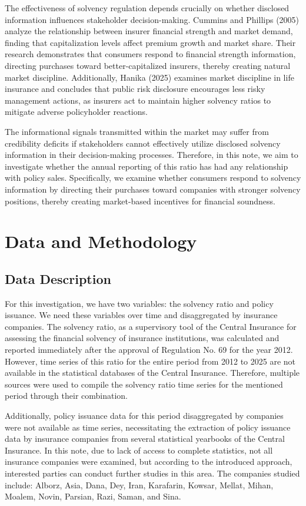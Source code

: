 \documentclass[twoside]{article}
\begin{document}
The effectiveness of solvency regulation depends crucially on whether disclosed information influences stakeholder decision-making. Cummins and Phillips (2005) analyze the relationship between insurer financial strength and market demand, finding that capitalization levels affect premium growth and market share. Their research demonstrates that consumers respond to financial strength information, directing purchases toward better-capitalized insurers, thereby creating natural market discipline. Additionally, Hanika (2025) examines market discipline in life insurance and concludes that public risk disclosure encourages less risky management actions, as insurers act to maintain higher solvency ratios to mitigate adverse policyholder reactions.

The informational signals transmitted within the market may suffer from credibility deficits if stakeholders cannot effectively utilize disclosed solvency information in their decision-making processes. Therefore, in this note, we aim to investigate whether the annual reporting of this ratio has had any relationship with policy sales. Specifically, we examine whether consumers respond to solvency information by directing their purchases toward companies with stronger solvency positions, thereby creating market-based incentives for financial soundness.

\section{Data and Methodology}

\subsection{Data Description}

For this investigation, we have two variables: the solvency ratio and policy issuance. We need these variables over time and disaggregated by insurance companies. The solvency ratio, as a supervisory tool of the Central Insurance for assessing the financial solvency of insurance institutions, was calculated and reported immediately after the approval of Regulation No. 69 for the year 2012. However, time series of this ratio for the entire period from 2012 to 2025 are not available in the statistical databases of the Central Insurance. Therefore, multiple sources were used to compile the solvency ratio time series for the mentioned period through their combination.

Additionally, policy issuance data for this period disaggregated by companies were not available as time series, necessitating the extraction of policy issuance data by insurance companies from several statistical yearbooks of the Central Insurance. In this note, due to lack of access to complete statistics, not all insurance companies were examined, but according to the introduced approach, interested parties can conduct further studies in this area. The companies studied include: Alborz, Asia, Dana, Dey, Iran, Karafarin, Kowsar, Mellat, Mihan, Moalem, Novin, Parsian, Razi, Saman, and Sina.
\end{document}

